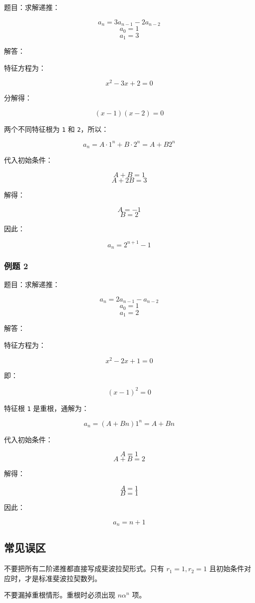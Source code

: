 \documentclass[UTF8,zihao=-4]{ctexart}
\begin{document}
题目：求解递推：

\[a_{n} = 3a_{n-1} - 2a_{n-2}\]
\[a_{0} = 1\]
\[a_{1} = 3\]

解答：

特征方程为：

\[x^{2} - 3x + 2 = 0\]

分解得：

\[(x - 1)(x - 2) = 0\]

两个不同特征根为 \texttt{1} 和 \texttt{2}，所以：

\[a_{n} = A\cdot 1^{n} + B\cdot 2^{n} = A + B2^{n}\]

代入初始条件：

\[A + B = 1\]
\[A + 2B = 3\]

解得：

\[A = -1\]
\[B = 2\]

因此：

\[a_{n} = 2^{n+1} - 1\]

\subsubsection*{例题 2}

题目：求解递推：

\[a_{n} = 2a_{n-1} - a_{n-2}\]
\[a_{0} = 1\]
\[a_{1} = 2\]

解答：

特征方程为：

\[x^{2} - 2x + 1 = 0\]

即：

\[(x - 1)^{2} = 0\]

特征根 \texttt{1} 是重根，通解为：

\[a_{n} = (A + Bn)1^{n} = A + Bn\]

代入初始条件：

\[A = 1\]
\[A + B = 2\]

解得：

\[A = 1\]
\[B = 1\]

因此：

\[a_{n} = n + 1\]

\subsection*{常见误区}

不要把所有二阶递推都直接写成斐波拉契形式。只有 $r_1 = 1, r_2 = 1$ 且初始条件对应时，才是标准斐波拉契数列。

不要漏掉重根情形。重根时必须出现 $n \alpha^n$ 项。
\end{document}
